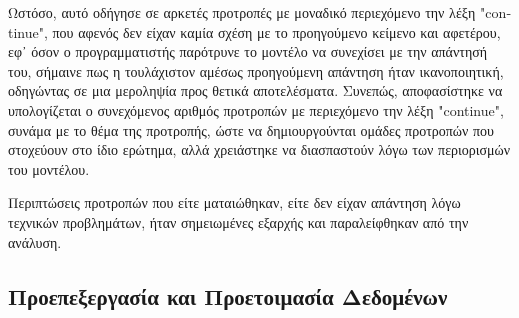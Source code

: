 Ωστόσο, αυτό οδήγησε σε αρκετές προτροπές με μοναδικό περιεχόμενο την
λέξη "\textlatin{continue}", που αφενός δεν είχαν καμία σχέση με το
προηγούμενο κείμενο και αφετέρου, εφ᾽ όσον ο προγραμματιστής παρότρυνε
το μοντέλο να συνεχίσει με την απάντησή του, σήμαινε πως η τουλάχιστον
αμέσως προηγούμενη απάντηση ήταν ικανοποιητική, οδηγώντας σε μια
μεροληψία προς θετικά αποτελέσματα. Συνεπώς, αποφασίστηκε να
υπολογίζεται ο συνεχόμενος αριθμός προτροπών με περιεχόμενο την λέξη
"\textlatin{continue}", συνάμα με το θέμα της προτροπής, ώστε να
δημιουργούνται ομάδες προτροπών που στοχεύουν στο ίδιο ερώτημα, αλλά
χρειάστηκε να διασπαστούν λόγω των περιορισμών του μοντέλου.

Περιπτώσεις προτροπών που είτε ματαιώθηκαν, είτε δεν είχαν απάντηση λόγω
τεχνικών προβλημάτων, ήταν σημειωμένες εξαρχής και παραλείφθηκαν από την
ανάλυση.

\subsection{Προεπεξεργασία και Προετοιμασία Δεδομένων}

